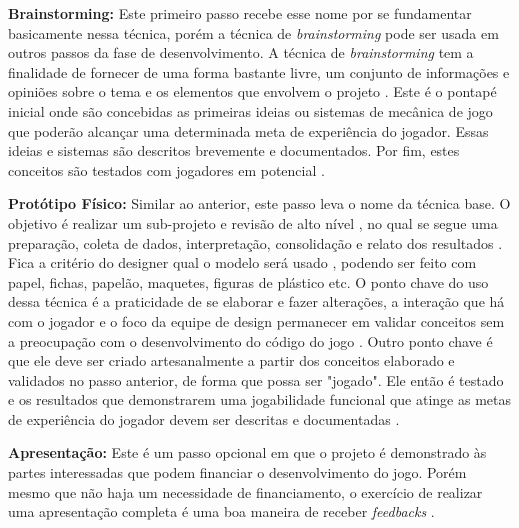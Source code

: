 \begin{enumerate}
    {\color{textmodified}
    \item \textbf{Brainstorming:} Este primeiro passo recebe esse nome por se fundamentar basicamente nessa técnica, porém a técnica de \textit{brainstorming} pode ser usada em outros passos da fase de desenvolvimento. A técnica de \textit{brainstorming} tem a finalidade de fornecer de uma forma bastante livre, um conjunto de informações e opiniões sobre o tema e os elementos que envolvem o projeto \cite[p. 155]{barbosa_silva}. Este é o pontapé inicial onde são concebidas as primeiras ideias ou sistemas de mecânica de jogo que poderão alcançar uma determinada meta de experiência do jogador. Essas ideias e sistemas são descritos brevemente e documentados. Por fim, estes conceitos são testados com jogadores em potencial \cite[p. 14, 15]{Fullerton_2008}. %
   
    \item \textbf{Protótipo Físico:} Similar ao anterior, este passo leva o nome da técnica base. O objetivo é realizar um sub-projeto e revisão de alto nível \cite[p. 63]{Pressman_2000}, no qual se segue uma preparação, coleta de dados, interpretação, consolidação e relato dos resultados \cite[p. 358]{barbosa_silva}. Fica a critério do designer qual o modelo será usado \cite[p. 15]{Fullerton_2008}, podendo ser feito com papel, fichas, papelão, maquetes, figuras de plástico etc. O ponto chave do uso dessa técnica é a praticidade de se elaborar e fazer alterações, a interação que há com o jogador e o foco da equipe de design permanecer em validar conceitos sem a preocupação com o desenvolvimento do código do jogo \cite[p. 15]{Fullerton_2008}. Outro ponto chave é que ele deve ser criado artesanalmente a partir dos conceitos elaborado e validados no passo anterior, de forma que possa ser "jogado". Ele então é testado e os resultados que demonstrarem uma jogabilidade funcional que atinge as metas de experiência do jogador devem ser descritas e documentadas \cite[p. 15]{Fullerton_2008}. %
    }
\newpage
    \item \textbf{Apresentação:} Este é um passo opcional em que o projeto é demonstrado às partes interessadas que podem financiar o desenvolvimento do jogo. Porém mesmo que não haja um necessidade de financiamento, o exercício de realizar uma apresentação completa é uma boa maneira de receber \textit{feedbacks} \cite[p. 15]{Fullerton_2008}.
    

\end{enumerate}
